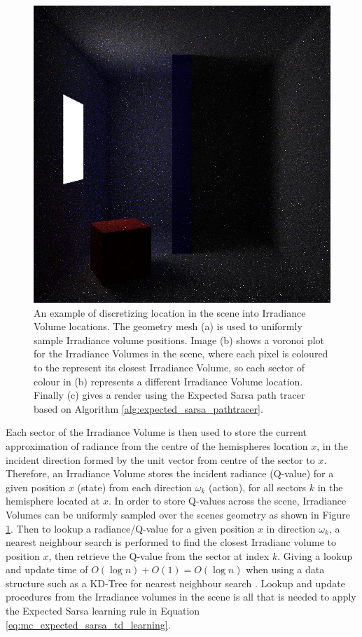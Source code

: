 \documentclass[../dissertation.tex]{subfiles}
\begin{document}
\begin{figure}[!htb]
\endminipage\hfill
{}
\includegraphics[width=1\textwidth]{images/renders/simple_room/reinforcement_16.png}
\endminipage
\caption{An example of discretizing location in the scene into Irradiance Volume locations. The geometry mesh (a) is used to uniformly sample Irradiance volume positions. Image (b) shows a voronoi plot for the Irradiance Volumes in the scene, where each pixel is coloured to the represent its closest Irradiance Volume, so each sector of colour in (b) represents a different Irradiance Volume location. Finally (c) gives a render using the Expected Sarsa path tracer based on Algorithm \ref{alg:expected_sarsa_pathtracer}.}
\label{fig:scene_discretization_example}
\end{figure}

Each sector of the Irradiance Volume is then used to store the current approximation of radiance from the centre of the hemispheres location $x$, in the incident direction formed by the unit vector from centre of the sector to $x$. Therefore, an Irradiance Volume stores the incident radiance (Q-value) for a given position $x$ (state) from each direction $\omega_k$ (action), for all sectors $k$ in the hemisphere located at $x$. In order to store Q-values across the scene, Irradiance Volumes can be uniformly sampled over the scenes geometry as shown in Figure \ref{fig:scene_discretization_example}. Then to lookup a radiance/Q-value for a given position $x$ in direction $\omega_k$, a nearest neighbour search is performed to find the closest Irradianc volume to position $x$, then retrieve the Q-value from the sector at index $k$. Giving a lookup and update time of $O(\log n) + O(1) = O(\log n)$ when using a data structure such as a KD-Tree for nearest neighbour search \cite{bentley1975multidimensional}. Lookup and update procedures from the Irradiance volumes in the scene is all that is needed to apply the Expected Sarsa learning rule in Equation \ref{eq:mc_expected_sarsa_td_learning}.
\end{document}

